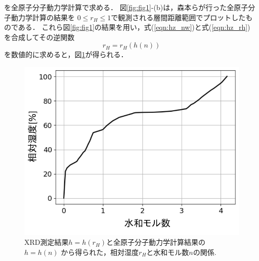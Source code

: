 を全原子分子動力学計算で求める．
図\ref{fig:fig1}-(b)は，森本ら\cite{Morimoto}が行った全原子分子動力学計算の結果を
$0\leq r_H \leq 1$で観測される層間距離範囲でプロットしたものである．
これら図\ref{fig:fig1}の結果を用い，式(\ref{eqn:hz_nw})と式(\ref{eqn:hz_rh})
を合成してその逆関数
\begin{equation}
	r_H=r_H(h(n))
	\label{eqn:rh_nw}
\end{equation}
を数値的に求めると，図\ref{fig:fig6}が得られる．
\begin{figure}[h]
	\begin{center}
	\includegraphics[width=0.6\linewidth]{Figs/fig6.pdf} 
	\end{center}
	\caption{
		XRD測定結果\(h=h(r_H)\)と全原子分子動力学計算結果の\(h=h(n)\)
		から得られた，相対湿度$r_H$と水和モル数$n$の関係.
	} 
	\label{fig:fig6}
\end{figure}
